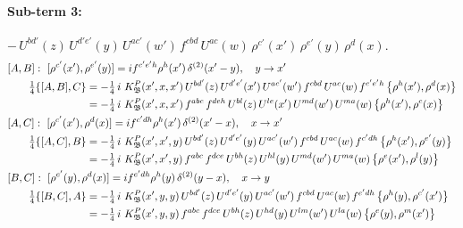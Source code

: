 \documentclass[10pt]{article}
\numberwithin{equation}{section}
\begin{document}
\paragraph{Sub-term 3:} $-\,U^{bd'}(z)\,U^{d'e'}(y)\,U^{ac'}(w')\,f^{cbd}\,U^{ac}(w)\,\rho^{c'}(x')\,\rho^{e'}(y)\,\rho^{d}(x)$.
\begin{align}
&[A,B]:\ [\rho^{c'}(x'),\rho^{e'}(y)]=i f^{c'e'h}\rho^{h}(x')\,\delta^{(2)}(x'-y),\quad y\to x'\notag\\
&\qquad \tfrac14\{[A,B],C\}=-\tfrac14\,i\,\,K^{P}_{\mathfrak B}(x',x,x')\,U^{bd'}(z)\,U^{d'e'}(x')\,U^{ac'}(w')\,f^{cbd}\,U^{ac}(w)\,f^{c'e'h}\,\big\{\rho^{h}(x'),\rho^{d}(x)\big\}\notag\\
&\qquad\phantom{\tfrac14\{[A,B],C\}}=-\tfrac14\,i\,\,K^{P}_{\mathfrak B}(x',x,x')\,f^{abc}\,f^{deh}\,U^{bl}(z)\,U^{le}(x')\,U^{md}(w')\,U^{ma}(w)\,\big\{\rho^{h}(x'),\rho^{c}(x)\big\}
\label{eq:GIII.I.P-3-AB}\\
&[A,C]:\ [\rho^{c'}(x'),\rho^{d}(x)]=i f^{c'dh}\rho^{h}(x')\,\delta^{(2)}(x'-x),\quad x\to x'\notag\\
&\qquad \tfrac14\{[A,C],B\}=-\tfrac14\,i\,\,K^{P}_{\mathfrak B}(x',x',y)\,U^{bd'}(z)\,U^{d'e'}(y)\,U^{ac'}(w')\,f^{cbd}\,U^{ac}(w)\,f^{c'dh}\,\big\{\rho^{h}(x'),\rho^{e'}(y)\big\}\notag\\
&\qquad\phantom{\tfrac14\{[A,C],B\}}=-\tfrac14\,i\,\,K^{P}_{\mathfrak B}(x',x',y)\,f^{abc}\,f^{dce}\,U^{bh}(z)\,U^{hl}(y)\,U^{md}(w')\,U^{ma}(w)\,\big\{\rho^{e}(x'),\rho^{l}(y)\big\}
\label{eq:GIII.I.P-3-AC}\\
&[B,C]:\ [\rho^{e'}(y),\rho^{d}(x)]=i f^{e'dh}\rho^{h}(y)\,\delta^{(2)}(y-x),\quad x\to y\notag\\
&\qquad \tfrac14\{[B,C],A\}=-\tfrac14\,i\,\,K^{P}_{\mathfrak B}(x',y,y)\,U^{bd'}(z)\,U^{d'e'}(y)\,U^{ac'}(w')\,f^{cbd}\,U^{ac}(w)\,f^{e'dh}\,\big\{\rho^{h}(y),\rho^{c'}(x')\big\}\notag\\
&\qquad\phantom{\tfrac14\{[B,C],A\}}=-\tfrac14\,i\,\,K^{P}_{\mathfrak B}(x',y,y)\,f^{abc}\,f^{dce}\,U^{bh}(z)\,U^{hd}(y)\,U^{lm}(w')\,U^{la}(w)\,\big\{\rho^{e}(y),\rho^{m}(x')\big\}
\label{eq:GIII.I.P-3-BC}
\end{align}
\end{document}
